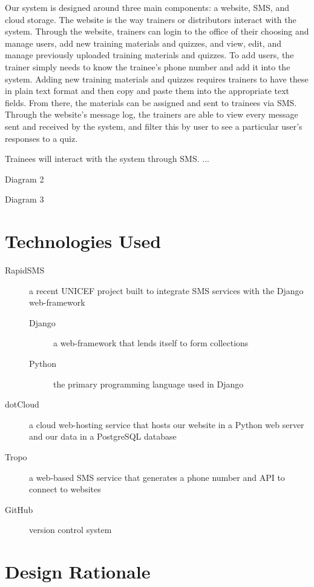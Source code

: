 Our system is designed around three main components: a website, SMS, and cloud storage. The website is the way trainers or distributors interact with the system. Through the website, trainers can login to the office of their choosing and manage users, add new training materials and quizzes, and view, edit, and manage previously uploaded training materials and quizzes. To add users, the trainer simply needs to know the trainee's phone number and add it into the system. Adding new training materials and quizzes requires trainers to have these in plain text format and then copy and paste them into the appropriate text fields. From there, the materials can be assigned and sent to trainees via SMS. Through the website's message log, the trainers are able to view every message sent and received by the system, and filter this by user to see a particular user's responses to a quiz.

Trainees will interact with the system through SMS. ...

Diagram 2

Diagram 3

\section{Technologies Used}
\begin{description}
	\item[RapidSMS] a recent UNICEF project built to integrate SMS services with the Django web-framework
	\begin{description}
		\item[Django] a web-framework that lends itself to form collections
		\item[Python] the primary programming language used in Django
	\end{description}
	\item[dotCloud] a cloud web-hosting service that hosts our website in a Python web server and our data in a PostgreSQL database
	\item[Tropo] a web-based SMS service that generates a phone number and API to connect to websites
	\item[GitHub] version control system
\end{description}

\section{Design Rationale}


